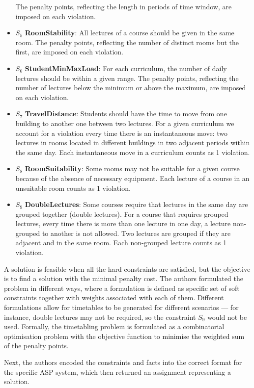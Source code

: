 \begin{itemize}
		The penalty points, reflecting the length in periods of time window, are
		imposed on each violation.
	\item \( S_5 \) \textbf{RoomStability}: All lectures of a course should be
		given in the same room.
		The penalty points, reflecting the number of distinct rooms but the
		first, are imposed on each violation.
	\item \( S_6 \) \textbf{StudentMinMaxLoad}: For each curriculum, the number
		of daily lectures should be within a given range.
		The penalty points, reflecting the number of lectures below the minimum
		or above the maximum, are imposed on each violation.
	\item \( S_7 \) \textbf{TravelDistance}: Students should have the time to
		move from one building to another one between two lectures.
		For a given curriculum we account for a violation every time there is an
		instantaneous move: two lectures in rooms located in different buildings
		in two adjacent periods within the same day.
		Each instantaneous move in a curriculum counts as 1 violation.
	\item \( S_8 \) \textbf{RoomSuitability}: Some rooms may not be suitable for
		a given course because of the absence of necessary equipment.
		Each lecture of a course in an unsuitable room counts as 1 violation.
	\item \( S_9 \) \textbf{DoubleLectures}: Some courses require that lectures
		in the same day are grouped together (double lectures).
		For a course that requires grouped lectures, every time there is more
		than one lecture in one day, a lecture non-grouped to another is not
		allowed.
		Two lectures are grouped if they are adjacent and in the same room.
		Each non-grouped lecture counts as 1 violation.
\end{itemize}
A solution is feasible when all the hard constraints are satisfied, but the
objective is to find a solution with the minimal penalty cost.
The authors formulated the problem in different ways, where a formulation is
defined as specific set of soft constraints together with weights associated
with each of them.
Different formulations allow for timetables to be generated for different
scenarios --- for instance, double lectures may not be required, so the 
constraint \( S_9 \) would not be used.
Formally, the timetabling problem is formulated as a combinatorial optimisation
problem with the objective function to minimise the weighted sum of the penalty
points.

Next, the authors encoded the constraints and facts into the correct format 
for the specific ASP system, which then returned an assignment representing a
solution.

